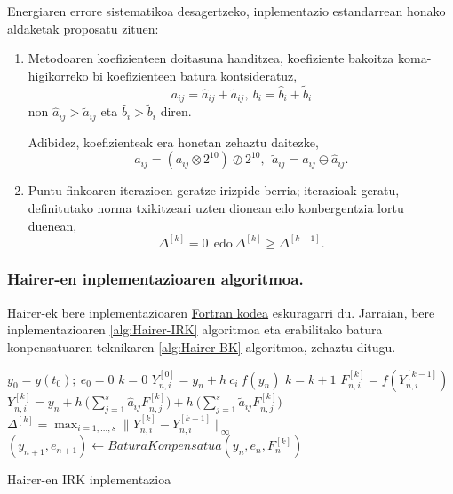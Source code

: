 Energiaren errore sistematikoa desagertzeko, inplementazio estandarrean honako aldaketak proposatu zituen:
\begin{enumerate}
\item Metodoaren koefizienteen doitasuna handitzea, koefiziente bakoitza koma-higikorreko bi koefizienteen batura kontsideratuz,
\begin{equation}
\label{eq:hkoef}
a_{ij}= \hat a_{ij}+\tilde a_{ij}, \ b_i= \hat b_i+\tilde b_i
\end{equation} 
non $\hat a_{ij}>\tilde a_{ij}$ eta  $\hat b_i>\tilde b_i$ diren. 

Adibidez, koefizienteak era honetan zehaztu daitezke,
\begin{equation*}
\hat a_{ij}=(a_{ij} \otimes 2^{10}) \oslash 2^{10},\ \ \tilde a_{ij}= a_{ij}\ominus \hat a_{ij}.
\end{equation*}

\item Puntu-finkoaren iterazioen geratze irizpide berria; iterazioak geratu, definitutako norma txikitzeari uzten dionean edo konbergentzia lortu duenean,
\begin{equation}
\label{eq:hstop}
\Delta^{[k]} = 0 \ \ \text{edo} \  \Delta^{[k]} \geqslant \Delta^{[k-1]}.
\end{equation}
  	 	
\end{enumerate}

\subsubsection*{Hairer-en inplementazioaren algoritmoa.}

Hairer-ek bere inplementazioaren \href{http://www.unige.ch/~hairer/preprints.html}{Fortran kodea}  eskuragarri du. Jarraian, bere inplementazioaren \ref{alg:Hairer-IRK} algoritmoa eta erabilitako batura konpensatuaren teknikaren \ref{alg:Hairer-BK} algoritmoa, zehaztu ditugu.
 
\begin{algorithm}[h!]
 \BlankLine
  $y_0=y(t_0); \ e_0=0$\;
  {
   \BlankLine
   $k=0$\;
   $Y_{n,i}^{[0]}=y_n+h \ c_i \ f(y_n) $\; 
   \BlankLine
   {
    \BlankLine 
    $k=k+1$\;
    $F_{n,i}^{[k]}=f(Y_{n,i}^{[k-1]}) $\;
    $Y_{n,i}^{[k]}=y_n+ h \ \big(\sum\limits_{j=1}^{s} \hat a_{ij} F_{n,j}^{[k]} \big) 
                          + h \ \big(\sum\limits_{j=1}^{s} \tilde a_{ij} F_{n,j}^{[k]} \big)$\; 
    $\Delta ^{[k]} = \max_{i=1,\dots,s}\|Y_{n,i}^{[k]}-Y_{n,i}^{[k-1]}\|_{\infty}$\;
   }
   \BlankLine
   $(y_{n+1},e_{n+1})\leftarrow BaturaKonpensatua(y_n,e_n,F_n^{[k]})$\;      
   \BlankLine
 }
 \caption{Hairer-en IRK inplementazioa}
 \label{alg:Hairer-IRK}
\end{algorithm}


